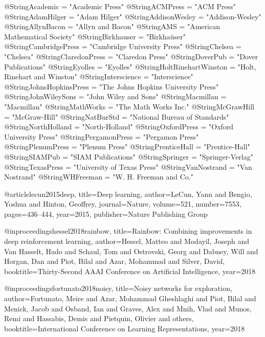  @String{Academic = "Academic Press" }
 @String{ACMPress = "{ACM} Press" }
 @String{AdamHilger = "Adam Hilger" }
 @String{AddisonWesley = "Addison-Wesley" }
 @String{AllynBacon = "Allyn and Bacon" }
 @String{AMS = "American Mathematical Society" }
 @String{Birkhauser = "Birkha{\"u}ser" }
 @String{CambridgePress = "Cambridge University Press" }
 @String{Chelsea = "Chelsea" }
 @String{ClaredonPress = "Claredon Press" }
 @String{DoverPub = "Dover Publications" }
 @String{Eyolles = "Eyolles" }
 @String{HoltRinehartWinston = "Holt, Rinehart and Winston" }
 @String{Interscience = "Interscience" }
 @String{JohnsHopkinsPress = "The Johns Hopkins University Press" }
 @String{JohnWileySons = "John Wiley and Sons" }
 @String{Macmillan = "Macmillan" }
 @String{MathWorks = "The Math Works Inc." }
 @String{McGrawHill = "McGraw-Hill" }
 @String{NatBurStd = "National Bureau of Standards" }
 @String{NorthHolland = "North-Holland" }
 @String{OxfordPress = "Oxford University Press" }  %
 @String{PergamonPress = "Pergamon Press" }
 @String{PlenumPress = "Plenum Press" }
 @String{PrenticeHall = "Prentice-Hall" }
 @String{SIAMPub = "{SIAM} Publications" }
 @String{Springer = "Springer-Verlag" }
 @String{TexasPress = "University of Texas Press" }
 @String{VanNostrand = "Van Nostrand" }
 @String{WHFreeman = "W. H. Freeman and Co." }


@article{lecun2015deep,
  title={Deep learning},
  author={LeCun, Yann and Bengio, Yoshua and Hinton, Geoffrey},
  journal={Nature},
  volume={521},
  number={7553},
  pages={436--444},
  year={2015},
  publisher={Nature Publishing Group}
}







@inproceedings{hessel2018rainbow,
  title={Rainbow: Combining improvements in deep reinforcement learning},
  author={Hessel, Matteo and Modayil, Joseph and Van Hasselt, Hado and Schaul, Tom and Ostrovski, Georg and Dabney, Will and Horgan, Dan and Piot, Bilal and Azar, Mohammad and Silver, David},
  booktitle={Thirty-Second AAAI Conference on Artificial Intelligence},
  year={2018}
}

@inproceedings{fortunato2018noisy,
  title={Noisy networks for exploration},
  author={Fortunato, Meire and Azar, Mohammad Gheshlaghi and Piot, Bilal and Menick, Jacob and Osband, Ian and Graves, Alex and Mnih, Vlad and Munos, Remi and Hassabis, Demis and Pietquin, Olivier and others},
  booktitle={International Conference on Learning Representations},
  year={2018}
}

